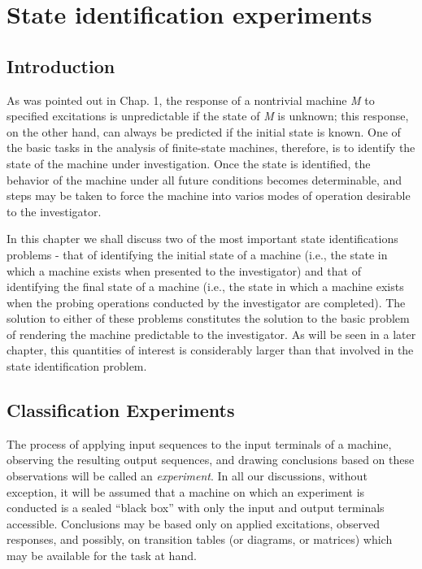 \chapter{State identification experiments}

\section{Introduction}

As was pointed out in Chap. 1, the response of a nontrivial machine \emph{M} to specified excitations is unpredictable if the state of \emph{M} is unknown; this response, on the other hand, can always be predicted if the initial state is known. One of the basic tasks in the analysis of finite-state machines, therefore, is to identify the state of the machine under investigation. Once the state is identified, the behavior of the machine under all future conditions becomes determinable, and steps may be taken to force the machine into varios modes of operation desirable to the investigator.

    In this chapter we shall discuss two of the most important state identifications problems - that of identifying the initial state of a machine (i.e., the state in which a machine exists when presented to the investigator) and that of identifying the final state of a machine (i.e., the state in which a machine exists when the probing operations conducted by the investigator are completed). The solution to either of these problems constitutes the solution to the basic problem of rendering the machine predictable to the investigator. As will be seen in a later chapter, this quantities of interest is considerably larger than that involved in the state identification problem.

\section{Classification Experiments}

    The process of applying input sequences to the input terminals of a machine, observing the resulting output sequences, and drawing conclusions based on these observations will be called an \emph{experiment}. In all our discussions, without exception, it will be assumed that a machine on which an experiment is conducted is a sealed ``black box'' with only the input and output terminals accessible. Conclusions may be based only on applied excitations, observed responses, and possibly, on transition tables (or diagrams, or matrices) which may be available for the task at hand.

